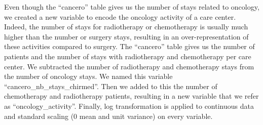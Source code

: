 Even though the ``cancero'' table gives us the number of stays related to
oncology, we created a new variable to encode the oncology activity of a care
center. Indeed, the number of stays for radiotherapy or chemotherapy is usually
much higher than the number or surgery stays, resulting in an
over-representation of these activities compared to surgery. The ``cancero''
table gives us the number of patients and the number of stays with radiotherapy
and chemotherapy per care center. We subtracted the number of radiotherapy and
chemotherapy stays from the number of oncology stays. We named this variable
``cancero\_nb\_stays\_chirmed''. Then we added to this the number of
chemotherapy and radiotherapy patients, resulting in a new variable that we
refer as ``oncology\_activity''. Finally, log transformation is applied to
continuous data and standard scaling (0 mean and unit variance) on every
variable.

